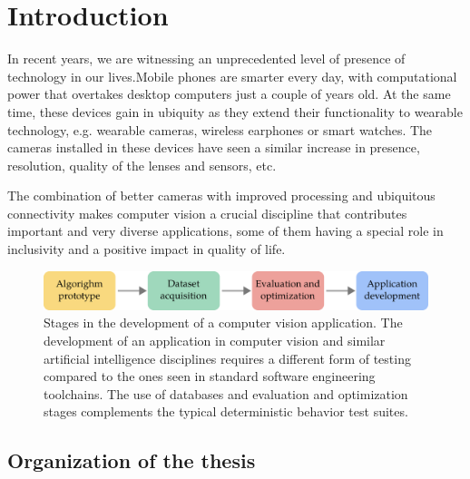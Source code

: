 \chapter{Introduction}\label{ch:introduction}

In recent years, we are witnessing an unprecedented level of presence of technology in our lives.Mobile phones are smarter every day, with computational power that overtakes desktop computers just a couple of years old. At the same time, these devices gain in ubiquity as they extend their functionality to wearable technology, e.g. wearable cameras, wireless earphones or smart watches. The cameras installed in these devices have seen a similar increase in presence, resolution, quality of the lenses and sensors, etc.

The combination of better cameras with improved processing and ubiquitous connectivity makes computer vision a crucial discipline that contributes important and very diverse applications, some of them having a special role in inclusivity and a positive impact in quality of life.

\begin{figure}
\centering
\includegraphics[width=\linewidth]{gfx/Chapter01/cv_dev_pipeline.pdf}
\caption{Stages in the development of a computer vision application. The development of an application in computer vision and similar artificial intelligence disciplines requires a different form of testing compared to the ones seen in standard software engineering toolchains. The use of databases and evaluation and optimization stages complements the typical deterministic behavior test suites.}
\label{fig:cv_dev_pipeline}
\end{figure}


\section{Organization of the thesis}

